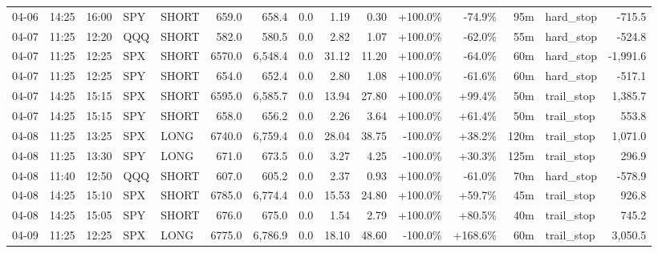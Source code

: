 \documentclass[11pt,a4paper,twoside]{article}
\begin{document}
\begin{landscape}
\begin{center}
\begin{longtable}{>{\color{txtmain}}l l l l l r r r r r r r r >{\color{txtmain}}l r}
04-06 & 14:25 & 16:00 & SPY & SHORT & 659.0 & 658.4 & 0.0 & 1.19 & 0.30 & \textcolor{wingreen}{+100.0\%} & \textcolor{lossred}{-74.9\%} & 95m & hard\_stop & \textcolor{lossred}{-715.5} \\
04-07 & 11:25 & 12:20 & QQQ & SHORT & 582.0 & 580.5 & 0.0 & 2.82 & 1.07 & \textcolor{wingreen}{+100.0\%} & \textcolor{lossred}{-62.0\%} & 55m & hard\_stop & \textcolor{lossred}{-524.8} \\
04-07 & 11:25 & 12:25 & SPX & SHORT & 6570.0 & 6,548.4 & 0.0 & 31.12 & 11.20 & \textcolor{wingreen}{+100.0\%} & \textcolor{lossred}{-64.0\%} & 60m & hard\_stop & \textcolor{lossred}{-1,991.6} \\
04-07 & 11:25 & 12:25 & SPY & SHORT & 654.0 & 652.4 & 0.0 & 2.80 & 1.08 & \textcolor{wingreen}{+100.0\%} & \textcolor{lossred}{-61.6\%} & 60m & hard\_stop & \textcolor{lossred}{-517.1} \\
04-07 & 14:25 & 15:15 & SPX & SHORT & 6595.0 & 6,585.7 & 0.0 & 13.94 & 27.80 & \textcolor{wingreen}{+100.0\%} & \textcolor{wingreen}{+99.4\%} & 50m & trail\_stop & \textcolor{wingreen}{1,385.7} \\
04-07 & 14:25 & 15:15 & SPY & SHORT & 658.0 & 656.2 & 0.0 & 2.26 & 3.64 & \textcolor{wingreen}{+100.0\%} & \textcolor{wingreen}{+61.4\%} & 50m & trail\_stop & \textcolor{wingreen}{553.8} \\
04-08 & 11:25 & 13:25 & SPX & LONG & 6740.0 & 6,759.4 & 0.0 & 28.04 & 38.75 & \textcolor{lossred}{-100.0\%} & \textcolor{wingreen}{+38.2\%} & 120m & trail\_stop & \textcolor{wingreen}{1,071.0} \\
04-08 & 11:25 & 13:30 & SPY & LONG & 671.0 & 673.5 & 0.0 & 3.27 & 4.25 & \textcolor{lossred}{-100.0\%} & \textcolor{wingreen}{+30.3\%} & 125m & trail\_stop & \textcolor{wingreen}{296.9} \\
04-08 & 11:40 & 12:50 & QQQ & SHORT & 607.0 & 605.2 & 0.0 & 2.37 & 0.93 & \textcolor{wingreen}{+100.0\%} & \textcolor{lossred}{-61.0\%} & 70m & hard\_stop & \textcolor{lossred}{-578.9} \\
04-08 & 14:25 & 15:10 & SPX & SHORT & 6785.0 & 6,774.4 & 0.0 & 15.53 & 24.80 & \textcolor{wingreen}{+100.0\%} & \textcolor{wingreen}{+59.7\%} & 45m & trail\_stop & \textcolor{wingreen}{926.8} \\
04-08 & 14:25 & 15:05 & SPY & SHORT & 676.0 & 675.0 & 0.0 & 1.54 & 2.79 & \textcolor{wingreen}{+100.0\%} & \textcolor{wingreen}{+80.5\%} & 40m & trail\_stop & \textcolor{wingreen}{745.2} \\
04-09 & 11:25 & 12:25 & SPX & LONG & 6775.0 & 6,786.9 & 0.0 & 18.10 & 48.60 & \textcolor{lossred}{-100.0\%} & \textcolor{wingreen}{+168.6\%} & 60m & trail\_stop & \textcolor{wingreen}{3,050.5} \\

\end{longtable}
\end{center}
\end{landscape}
\end{document}
